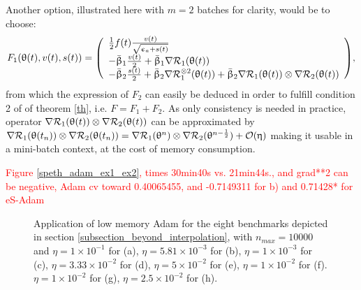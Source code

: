 \documentclass[article,authoryear,jmlmc]{beg_32}             %
\begin{document}
Another option, illustrated here with $m=2$ batches for clarity, would be to choose:
\begin{eqnarray}
\label{F_j_adam_2}
F_1(\theta(t),v(t),s(t))=\left(\begin{array}{l}
  \frac{1}{2}f(t) \frac{v(t)}{\sqrt{\epsilon_a+s(t)}}\\
     -\bar{\beta}_1 \frac{v(t)}{2}+\bar{\beta}_1\nR_1(\theta(t))\\
     -\bar{\beta}_2 \frac{s(t)}{2}+\bar{\beta}_2\nR_1^{\otimes 2}(\theta(t))+\bar{\beta}_2\nR_1(\theta(t))\otimes\nR_2(\theta(t)) \\
  \end{array}\right),
\end{eqnarray}
from which the expression of $F_2$ can easily be deduced in order to fulfill condition 2 of of theorem \ref{th}, i.e. $F=F_1+F_2$. 
As only consistency is needed in practice, operator 
$
\nabla \mathcal{R}_1(\uptheta(t))\otimes\nabla \mathcal{R}_2(\uptheta(t))
$
can be approximated by  
$
\nabla \mathcal{R}_1(\uptheta(t_n))\otimes\nabla \mathcal{R}_2(\uptheta(t_n)) = \nabla \mathcal{R}_1(\uptheta^n)\otimes\nabla \mathcal{R}_2(\uptheta^{n-\frac12}) + \mathcal{O}(\upeta)
$
making it usable in a mini-batch context, at the cost of memory consumption. 

\textcolor{red}{Figure \ref{speth_adam_ex1_ex2}, times 30min40s vs. 21min44s., and grad**2 can be negative, Adam cv toward 0.40065455, and -0.7149311 for b) and 0.71428* for
eS-Adam}

\begin{figure}[h!]
	\centering
	\scalebox{0.60}{}
        \caption{
          Application of low memory Adam for the eight benchmarks depicted in section \ref{subsection_beyond_interpolation}, with $n_{max}=10000$ and
 $\eta = 1   \times 10^{-1}$  for \exOne    (a),
 $\eta = 5.81\times 10^{-3}$  for \exTwo    (b),
 $\eta = 1   \times 10^{-3}$  for \exThree  (c),
 $\eta = 3.33\times 10^{-2}$  for \exFour   (d),
 $\eta = 5   \times 10^{-2}$  for \exFive   (e),
 $\eta = 1   \times 10^{-2}$  for \exSix    (f).
 $\eta = 1   \times 10^{-2}$  for \exSeven  (g),
 $\eta = 2.5 \times 10^{-2}$  for \exHeight (h).
}
	\label{adam_exs}
\end{figure}
\end{document}
